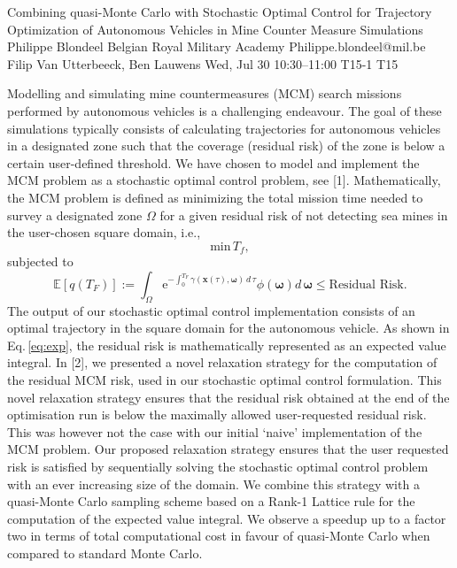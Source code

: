 \documentclass[12pt,lettersize,oneside]{book} %
\begin{document}
\begin{talk}
  {Combining quasi-Monte Carlo with Stochastic Optimal Control for Trajectory Optimization of Autonomous Vehicles in Mine Counter Measure Simulations}%
  {Philippe Blondeel}%
  {Belgian Royal Military Academy}%
  {Philippe.blondeel@mil.be}%
  {Filip Van Utterbeeck, Ben Lauwens}%
  {}%
  {Wed, Jul 30 10:30--11:00}%
  {T15-1}%
  {T15}%
  
    
   
Modelling and simulating mine countermeasures (MCM) search missions performed by autonomous vehicles is a challenging endeavour. The goal of these simulations typically consists of calculating trajectories for autonomous vehicles in a designated zone such that the coverage (residual risk) of the zone is below a certain user-defined threshold. We have chosen to model and implement the MCM problem as a stochastic optimal control problem, see [1]. Mathematically, the MCM problem is defined as minimizing the total mission time needed to survey a designated zone $\Omega$ for a given residual risk of not detecting sea mines in the  user-chosen square  domain, i.e., 
\begin{equation}
\text{min}\, T_f,
\label{eq:min}
\end{equation}
subjected to
\begin{equation}
 \mathbb{E}[q\left(T_F\right)] :=  \int_\Omega \text{e}^{-\int_0^{T_F} \gamma\left(\bm{x}\left(\tau\right),\bm{\omega}\right)\, d\,\tau}\phi\left(\bm{\omega}\right) d\,\bm{\omega} \leq \text{Residual Risk}.
\label{eq:exp}
\end{equation}
The output of our stochastic optimal control implementation consists of an optimal trajectory in the square domain for the autonomous vehicle.  As shown in Eq.\,\eqref{eq:exp}, the residual risk is mathematically represented as an expected value integral. In [2], we presented a novel relaxation strategy for the computation of the residual MCM risk, used in our stochastic optimal control formulation. This novel relaxation strategy ensures that the  residual risk obtained at the end of the optimisation run is below the maximally allowed user-requested residual risk. This was however not the case  with our initial `naive' implementation of the MCM problem. Our proposed relaxation strategy ensures that the user requested risk is satisfied by sequentially solving the stochastic optimal control problem with an ever increasing size of the domain. We combine this strategy with  a quasi-Monte Carlo  sampling scheme based on a Rank-1 Lattice rule for the computation of the expected value integral. We observe a speedup up to a factor two in terms of total computational cost in favour of quasi-Monte Carlo when compared to standard Monte Carlo.



\end{talk}
\end{document}
